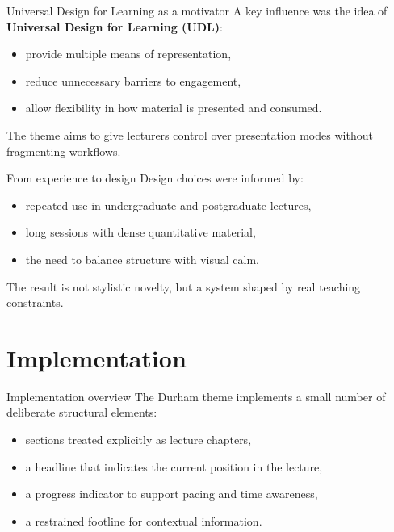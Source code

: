 \documentclass[aspectratio=169]{beamer}
\begin{document}
\begin{frame}{Universal Design for Learning as a motivator}
A key influence was the idea of \textbf{Universal Design for Learning (UDL)}:
\begin{itemize}
  \item provide multiple means of representation,
  \item reduce unnecessary barriers to engagement,
  \item allow flexibility in how material is presented and consumed.
\end{itemize}

\vspace{0.6em}
The theme aims to give lecturers control over presentation modes without fragmenting workflows.
\end{frame}

\begin{frame}{From experience to design}
Design choices were informed by:
\begin{itemize}
  \item repeated use in undergraduate and postgraduate lectures,
  \item long sessions with dense quantitative material,
  \item the need to balance structure with visual calm.
\end{itemize}

\vspace{0.6em}
The result is not stylistic novelty, but a system shaped by real teaching constraints.
\end{frame}

\section{Implementation}

\begin{frame}{Implementation overview}
The Durham theme implements a small number of deliberate structural elements:
\begin{itemize}
  \item sections treated explicitly as lecture chapters,
  \item a headline that indicates the current position in the lecture,
  \item a progress indicator to support pacing and time awareness,
  \item a restrained footline for contextual information.
\end{itemize}
\end{frame}
\end{document}
